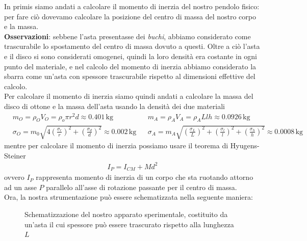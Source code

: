\documentclass{article}
\begin{document}
In primis siamo andati a calcolare il momento di inerzia del nostro pendolo fisico: per fare ciò dovevamo calcolare la posizione del centro di massa del nostro corpo e la massa. \\
\textbf{Osservazioni}: sebbene l'asta presentasse dei \emph{buchi}, abbiamo considerato come trascurabile lo spostamento del centro di massa dovuto a questi. Oltre a ciò l'asta e il disco si sono considerati omogenei, quindi la loro densità era costante in ogni punto del materiale, e nel calcolo del momento di inerzia abbiamo considerato la sbarra come un'asta con spessore trascurabile rispetto al dimensioni effettive del calcolo. \\
Per calcolare il momento di inerzia siamo quindi andati a calcolare la massa del disco di ottone e la massa dell'asta usando la densità dei due materiali
\begin{align*}
	&m_O = \rho_O V_O = \rho_o \pi r^2 d \approx 0.401 \, \si{\kilogram} & &m_A = \rho_A V_A = \rho_A Llh \approx 0.0926 \, \si{\kilogram} \\
	&\sigma_O = m_0 \sqrt{4 \left(\frac{\sigma_r}{r} \right)^2 + \left( \frac{\sigma_d}{d} \right)^2} \approx 0.002 \, \si{\kilogram} & &\sigma_A = m_A \sqrt{ \left(\frac{\sigma_L}{L} \right)^2 + \left( \frac{\sigma_l}{l} \right)^2 + \left( \frac{\sigma_h}{h} \right)^2} \approx 0.0008 \, \si{\kilogram}
\end{align*}
mentre per calcolare il momento di inerzia possiamo usare il teorema di Hyugens-Steiner
\begin{align*}
	I_P = I_{CM} + Md^2
\end{align*}
ovvero $I_P$ rappresenta momento di inerzia di un corpo che sta ruotando attorno ad un asse $P$ parallelo all'asse di rotazione passante per il centro di massa. \\
Ora, la nostra strumentazione può essere schematizzata nella seguente maniera:
\begin{figure}[H]
	\centering
{}
\caption{Schematizzazione del nostro apparato sperimentale, costituito da un'asta il cui spessore può essere trascurato rispetto alla lunghezza $L$}
\end{figure}
\end{document}
